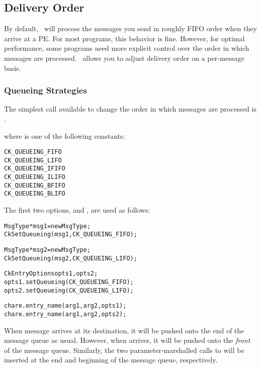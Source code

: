 \subsection{Delivery Order}

By default, \charmpp\ will process the messages you send in roughly
FIFO order when they arrive at a PE.
For most programs, this behavior is fine.  However, for optimal
performance, some programs need more explicit control over the order
in which messages are processed. \charmpp\ allows you to adjust
delivery order on a per-message basis.


\subsubsection{Queueing Strategies}
\label{queueing strategies}

The simplest call available to change the order in which messages
are processed is .


where  is one of the following constants:

\begin{alltt}
  CK_QUEUEING_FIFO
  CK_QUEUEING_LIFO
  CK_QUEUEING_IFIFO
  CK_QUEUEING_ILIFO
  CK_QUEUEING_BFIFO
  CK_QUEUEING_BLIFO
\end{alltt}

The first two options,   and
, are used as follows:

\begin{alltt}
  MsgType *msg1 = new MsgType ;
  CkSetQueueing(msg1, CK_QUEUEING_FIFO);

  MsgType *msg2 = new MsgType ;
  CkSetQueueing(msg2, CK_QUEUEING_LIFO);

  CkEntryOptions opts1, opts2;
  opts1.setQueueing(CK_QUEUEING_FIFO);
  opts2.setQueueing(CK_QUEUEING_LIFO);

  chare.entry_name(arg1, arg2, opts1);
  chare.entry_name(arg1, arg2, opts2);
\end{alltt}

When message  arrives at its destination, it will be pushed
onto the end of the message queue as usual.  However, when 
arrives, it will be pushed onto the {\em front} of the message
queue. Similarly, the two parameter-marshalled calls to 
will be inserted at the end and beginning of the message queue,
respectively.

